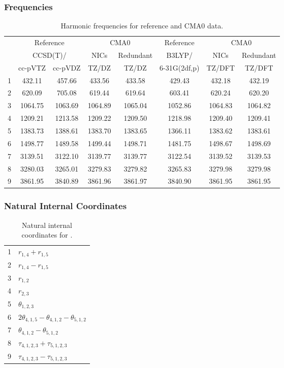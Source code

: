 \documentclass[10pt,oneside]{article}
\begin{document}
\begin{table}[h!]
\subsubsection*{Frequencies}
\centering
\caption{Harmonic frequencies for reference and CMA0 data.}
\begin{tabular}{cccccccc}
\toprule
{} & \multicolumn{2}{c}{Reference} & \multicolumn{2}{c}{CMA0} &    Reference & \multicolumn{2}{c}{CMA0} \\
{} & \multicolumn{2}{c}{CCSD(T)/} &    NICs &  Redundant &       B3LYP/ &    NICs & Redundant \\
{} &   cc-pVTZ & cc-pVDZ &   TZ/DZ &      TZ/DZ & 6-31G(2df,p) &  TZ/DFT &    TZ/DFT \\
\midrule
1 &    432.11 &  457.66 &  433.56 &     433.58 &       429.43 &  432.18 &    432.19 \\
2 &    620.09 &  705.08 &  619.44 &     619.64 &       603.41 &  620.24 &    620.20 \\
3 &   1064.75 & 1063.69 & 1064.89 &    1065.04 &      1052.86 & 1064.83 &   1064.82 \\
4 &   1209.21 & 1213.58 & 1209.22 &    1209.50 &      1218.98 & 1209.40 &   1209.41 \\
5 &   1383.73 & 1388.61 & 1383.70 &    1383.65 &      1366.11 & 1383.62 &   1383.61 \\
6 &   1498.77 & 1489.58 & 1499.44 &    1498.71 &      1481.75 & 1498.67 &   1498.69 \\
7 &   3139.51 & 3122.10 & 3139.77 &    3139.77 &      3122.54 & 3139.52 &   3139.53 \\
8 &   3280.03 & 3265.01 & 3279.83 &    3279.82 &      3265.83 & 3279.98 &   3279.98 \\
9 &   3861.95 & 3840.89 & 3861.96 &    3861.97 &      3840.90 & 3861.95 &   3861.95 \\
\bottomrule
\end{tabular}
\end{table}

\begin{table}[h!]
\subsubsection*{Natural Internal Coordinates}
\centering
\caption{Natural internal coordinates for .}
\small
\begin{tabular}{ll}
\toprule
  1   & $r_{1,4} + r_{1,5}$ \\
  2   & $r_{1,4} - r_{1,5}$ \\
  3   & $r_{1,2}$ \\
  4   & $r_{2,3}$ \\
  5   & $\theta_{1,2,3}$ \\
  6   & $2\theta_{4,1,5} - \theta_{4,1,2} - \theta_{5,1,2}$ \\
  7   & $\theta_{4,1,2} - \theta_{5,1,2}$ \\
  8   & $\tau_{4,1,2,3} + \tau_{5,1,2,3}$ \\
  9   & $\tau_{4,1,2,3} - \tau_{5,1,2,3}$ \\
\bottomrule
\end{tabular}
\end{table}
\end{document}
